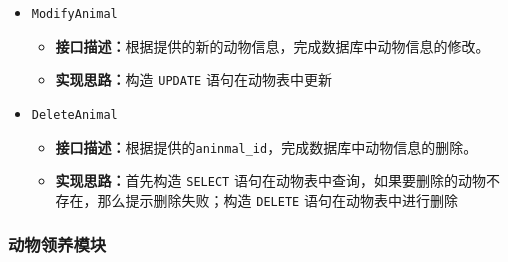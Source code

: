 \documentclass[12pt,a4paper,UTF8]{article}
\begin{document}
\begin{itemize}
  \item \verb|ModifyAnimal|
  \begin{itemize}
  \item \textbf{接口描述：}根据提供的新的动物信息，完成数据库中动物信息的修改。
  \item \textbf{实现思路：}构造 \verb|UPDATE| 语句在动物表中更新
  \end{itemize}

  \item \verb|DeleteAnimal|
  \begin{itemize}
  \item \textbf{接口描述：}根据提供的\verb|aninmal_id|，完成数据库中动物信息的删除。
  \item \textbf{实现思路：}首先构造 \verb|SELECT| 语句在动物表中查询，如果要删除的动物不存在，那么提示删除失败；构造 \verb|DELETE| 语句在动物表中进行删除
  \end{itemize}

\end{itemize}

\subsubsection{动物领养模块}
\end{document}

